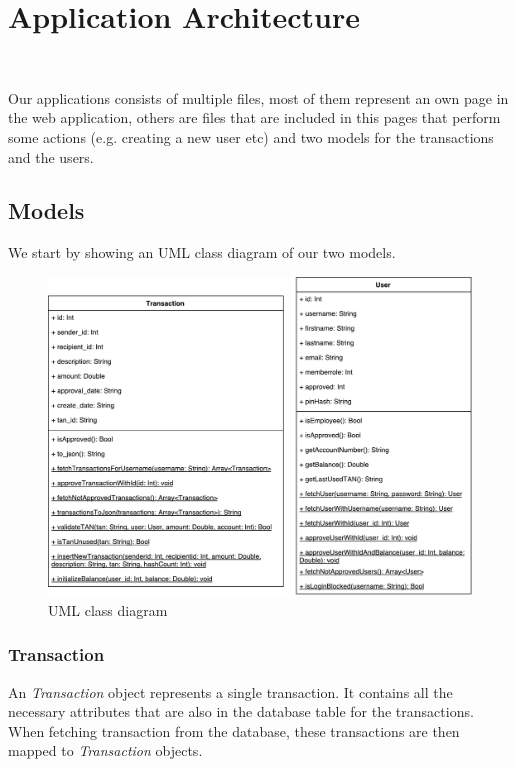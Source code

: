 \documentclass[headsepline,footsepline,footinclude=false,oneside,fontsize=11pt,paper=a4,listof=totoc,bibliography=totoc]{scrbook} %
\begin{document}
%

\chapter{Application Architecture} \

Our applications consists of multiple files, most of them represent an own page in the web application, others are files that are included in this pages that perform some actions (e.g. creating a new user etc) and two models for the transactions and the users.

\section{Models}

We start by showing an UML class diagram of our two models.

\begin{figure}[!ht]
	\centering
	\includegraphics[scale=0.55]{figures/class_diagram.pdf}
	\caption{UML class diagram}
	\label{fig1}
\end{figure}

\subsection{Transaction}

An \textit{Transaction} object represents a single transaction. It contains all the necessary attributes that are also in the database table for the transactions. When fetching transaction from the database, these transactions are then mapped to \textit{Transaction} objects.
\end{document}
